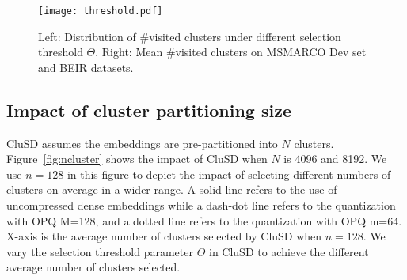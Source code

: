 \begin{figure}[h!]
    \centering
    \texttt{[image: threshold.pdf]}
    \caption{Left: Distribution  of \#visited clusters under different selection threshold $\Theta$.
Right: Mean \#visited clusters on MSMARCO Dev set and BEIR datasets.}
    \label{fig:thresholds}
\end{figure}

\subsection{Impact of  cluster partitioning size}
\label{sect:clusterno}

CluSD assumes the embeddings are  pre-partitioned into $N$ clusters.  Figure~\ref{fig:ncluster} shows the impact of CluSD when
$N$ is  4096 and  8192.
We use $n=128$ in this figure to depict the impact of selecting different numbers of clusters on average in a wider range.
A  solid line refers to the use of uncompressed dense embeddings while  a dash-dot line refers to the quantization with OPQ M=128, 
and a dotted line refers to the quantization  with OPQ m=64. X-axis is the average number of clusters selected by CluSD when $n=128$.
We vary the selection threshold parameter $\Theta$ in CluSD to achieve the different average number of clusters selected. 

